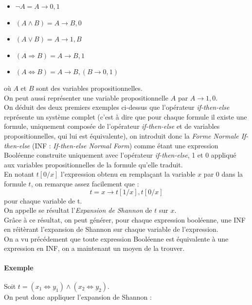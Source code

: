 \documentclass[a4paper, oneside]{report}
\begin{document}
\begin{itemize}
\item $ \neg A = A \rightarrow 0, 1$
\item $ (A \wedge B) = A \rightarrow B, 0$
\item $ (A \vee B) = A \rightarrow 1, B$
\item $ (A \Rightarrow B) = A \rightarrow B, 1$
\item $ (A \Leftrightarrow B) = A \rightarrow B, (B \rightarrow 0, 1)$
\end{itemize}

où $A$ et $B$ sont des variables propositionnelles.\\

\noindent On peut aussi représenter une variable propositionnelle $A$ par $A \rightarrow 1, 0$.\\

\noindent On déduit des deux premiers exemples ci-dessus que l'opérateur \textit{if-then-else} représente un système complet (c'est à dire que pour chaque formule il existe une formule, uniquement composée de l'opérateur \textit{if-then-else} et de variables propositionnelles, qui lui est équivalente), on introduit donc la \textit{Forme Normale If-then-else} (INF : \textit{If-then-else Normal Form}) comme étant une expression Booléenne construite uniquement avec l'opérateur \textit{if-then-else}, 1 et 0 appliqué aux variables propositionnelles de la formule qu'elle traduit.\\

En notant $t[0/x]$ l'expression obtenu en remplaçant la variable $x$ par $0$ dans la formule $t$, on remarque assez facilement que :
$$ t = x \rightarrow t[1/x], t[0/x] $$ pour chaque variable de t.\\
On appelle se résultat l'\textit{Expansion de Shannon} de $t$ sur $x$.\\
Grâce à ce résultat, on peut générer, pour chaque expression booléenne, une INF en réitèrant l'expansion de Shannon sur chaque variable de l'expression.\\
On a vu précédement que toute expression Booléenne est équivalente à une expression en INF, on a maintenant un moyen de la trouver.\\

\paragraph{Exemple} Soit $t = ( x_1 \Leftrightarrow y_1 ) \wedge ( x_2 \Leftrightarrow y_2 )$.\\
On peut donc appliquer l'expansion de Shannon :
\end{document}
